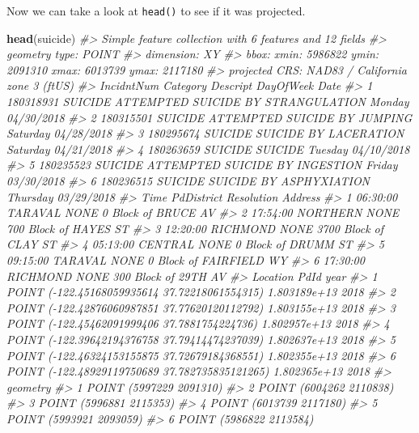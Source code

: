 \documentclass[
  12pt,
]{book}
\newenvironment{Shaded}{\begin{snugshade}}{\end{snugshade}}
\newcommand{\CommentTok}[1]{\textcolor[rgb]{0.56,0.35,0.01}{\textit{#1}}}
\newcommand{\KeywordTok}[1]{\textcolor[rgb]{0.13,0.29,0.53}{\textbf{#1}}}
\newcommand{\NormalTok}[1]{#1}
\begin{document}
Now we can take a look at \texttt{head()} to see if it was projected.

\begin{Shaded}
\begin{Highlighting}[]
\KeywordTok{head}\NormalTok{(suicide)}
\CommentTok{\#> Simple feature collection with 6 features and 12 fields}
\CommentTok{\#> geometry type:  POINT}
\CommentTok{\#> dimension:      XY}
\CommentTok{\#> bbox:           xmin: 5986822 ymin: 2091310 xmax: 6013739 ymax: 2117180}
\CommentTok{\#> projected CRS:  NAD83 / California zone 3 (ftUS)}
\CommentTok{\#>   IncidntNum Category                           Descript DayOfWeek       Date}
\CommentTok{\#> 1  180318931  SUICIDE ATTEMPTED SUICIDE BY STRANGULATION    Monday 04/30/2018}
\CommentTok{\#> 2  180315501  SUICIDE       ATTEMPTED SUICIDE BY JUMPING  Saturday 04/28/2018}
\CommentTok{\#> 3  180295674  SUICIDE              SUICIDE BY LACERATION  Saturday 04/21/2018}
\CommentTok{\#> 4  180263659  SUICIDE                            SUICIDE   Tuesday 04/10/2018}
\CommentTok{\#> 5  180235523  SUICIDE     ATTEMPTED SUICIDE BY INGESTION    Friday 03/30/2018}
\CommentTok{\#> 6  180236515  SUICIDE            SUICIDE BY ASPHYXIATION  Thursday 03/29/2018}
\CommentTok{\#>       Time PdDistrict Resolution                 Address}
\CommentTok{\#> 1 06:30:00    TARAVAL       NONE     0 Block of BRUCE AV}
\CommentTok{\#> 2 17:54:00   NORTHERN       NONE   700 Block of HAYES ST}
\CommentTok{\#> 3 12:20:00   RICHMOND       NONE   3700 Block of CLAY ST}
\CommentTok{\#> 4 05:13:00    CENTRAL       NONE     0 Block of DRUMM ST}
\CommentTok{\#> 5 09:15:00    TARAVAL       NONE 0 Block of FAIRFIELD WY}
\CommentTok{\#> 6 17:30:00   RICHMOND       NONE    300 Block of 29TH AV}
\CommentTok{\#>                                         Location         PdId year}
\CommentTok{\#> 1  POINT ({-}122.45168059935614 37.72218061554315) 1.803189e+13 2018}
\CommentTok{\#> 2  POINT ({-}122.42876060987851 37.77620120112792) 1.803155e+13 2018}
\CommentTok{\#> 3   POINT ({-}122.45462091999406 37.7881754224736) 1.802957e+13 2018}
\CommentTok{\#> 4  POINT ({-}122.39642194376758 37.79414474237039) 1.802637e+13 2018}
\CommentTok{\#> 5  POINT ({-}122.46324153155875 37.72679184368551) 1.802355e+13 2018}
\CommentTok{\#> 6 POINT ({-}122.48929119750689 37.782735835121265) 1.802365e+13 2018}
\CommentTok{\#>                  geometry}
\CommentTok{\#> 1 POINT (5997229 2091310)}
\CommentTok{\#> 2 POINT (6004262 2110838)}
\CommentTok{\#> 3 POINT (5996881 2115353)}
\CommentTok{\#> 4 POINT (6013739 2117180)}
\CommentTok{\#> 5 POINT (5993921 2093059)}
\CommentTok{\#> 6 POINT (5986822 2113584)}
\end{Highlighting}
\end{Shaded}
\end{document}
